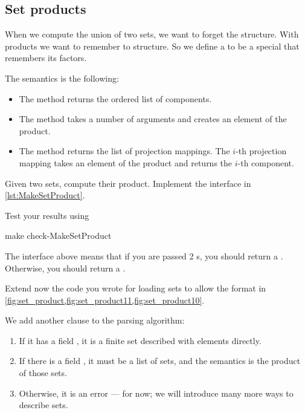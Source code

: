 \subsection{Set products}

When we compute the union of two sets, we want to forget the structure. With products we want to remember to structure.
So we define a  to be a special \Setoid that remembers its factors.



The semantics is the following:
\begin{itemize}
  \item The method  returns the ordered list of components.
  \item The method  takes a number of arguments and creates an element of the product.
  \item The method  returns the list of projection mappings.
  The $i$-th projection mapping takes an element of the product and returns the $i$-th component.

\end{itemize}


\begin{codeexercise}
  Given two sets, compute their product. Implement the interface in \cref{lst:MakeSetProduct}.

  Test your results using

  \begin{console}
    make check-MakeSetProduct
  \end{console}

\end{codeexercise}



The interface above means that if you are passed 2 \FiniteSet{}s, you should return a \FiniteSet.
Otherwise, you should return a \Setoid.



%

%

Extend now the code you wrote for loading sets to allow the format in \cref{fig:set_product,fig:set_product11,fig:set_product10}.

We add another clause to the parsing algorithm:
\begin{enumerate}
  \item If it has a field , it is a finite set described with elements directly.
  \item If there is a field , it must be a list of sets, and the semantics is the product of those sets.
  \item Otherwise, it is an error --- for now; we will introduce many more ways to describe sets.
\end{enumerate}


